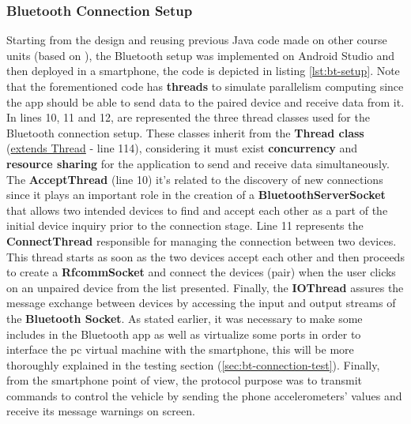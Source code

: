 \subsubsection{Bluetooth Connection Setup}
\label{sec:bluetooth-connection-setup}
Starting from the design and reusing previous Java code made on other course units (based on \cite{btchatsrc}), the Bluetooth setup was implemented on Android Studio and then deployed in a smartphone, the code is depicted in listing \ref{lst:bt-setup}.
%
Note that the forementioned code has \textbf{threads} to simulate parallelism computing since the app should be able to send data to the paired device and receive data from it.
%
In lines 10, 11 and 12, are represented the three thread classes used for the Bluetooth connection setup. These classes inherit from the \textbf{Thread class} (\underline{extends Thread} - line 114), considering it must exist \textbf{concurrency} and \textbf{resource sharing} for the application to send and receive data simultaneously. 
%
The \textbf{AcceptThread} (line 10) it's related to the discovery of new connections since it plays an important role in the creation of a \textbf{BluetoothServerSocket} that allows two intended devices to find and accept each other as a part of the initial device inquiry prior to the connection stage. Line 11 represents the \textbf{ConnectThread} responsible for managing the connection between two devices. This thread starts as soon as the two devices accept each other and then proceeds to create a \textbf{RfcommSocket} and connect the devices (pair) when the user clicks on an unpaired device from the list presented. Finally, the \textbf{IOThread} assures the message exchange between devices by accessing the input and output streams of the \textbf{Bluetooth Socket}.
%
As stated earlier, it was necessary to make some includes in the Bluetooth app as well as virtualize some ports in order to interface the \gls{pc} virtual machine with the smartphone, this will be more thoroughly explained in the testing section (\ref{sec:bt-connection-test}).
%
Finally, from the smartphone point of view, the protocol purpose was to transmit commands to control the vehicle by sending the phone accelerometers' values and receive its message warnings on screen.\\
%

%


